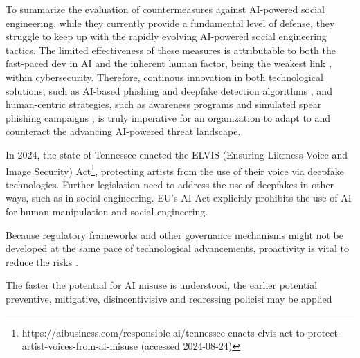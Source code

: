 To summarize the evaluation of countermeasures against AI-powered social engineering, while they currently provide a fundamental level of defense, they struggle to keep up with the rapidly evolving AI-powered social engineering tactics. The limited effectiveness of these measures is attributable to both the fast-paced dev in AI and the inherent human factor, being the weakest link \citep{mitnick_The_Art_of_Deception_2003}, within cybersecurity. Therefore, continous innovation in both technological solutions, such as AI-based phishing and deepfake detection algorithms \citep{mirskyTheCreationAndDetectionOfDeepfakes2021}, and human-centric strategies, such as awareness programs and simulated spear phishing campaigns \citep{salahdineSocialEngineeringAttacks2019}, is truly imperative for an organization to adapt to and counteract the advancing AI-powered threat landscape.

In 2024, the state of Tennessee enacted the ELVIS (Ensuring Likeness Voice and Image Security) Act\footnote{https://aibusiness.com/responsible-ai/tennessee-enacts-elvis-act-to-protect-artist-voices-from-ai-misuse (accessed 2024-08-24)}, protecting artists from the use of their voice via deepfake technologies. Further legislation need to address the use of deepfakes in other ways, such as in social engineering. EU's AI Act explicitly prohibits the use of AI for human  manipulation and social engineering.

Because regulatory frameworks and other governance mechanisms might not be developed at the same pace of technological advancements, proactivity is vital to reduce the risks \citep{blauthArtificialIntelligenceCrimeOverviewMaliciousUseAbuse2022}.

The faster the potential for AI misuse is understood, the earlier potential preventive, mitigative, disincentivisive and redressing policisi may be applied \citep{king_AI_Crime_Interdisciplinary_Analysis_2019}
